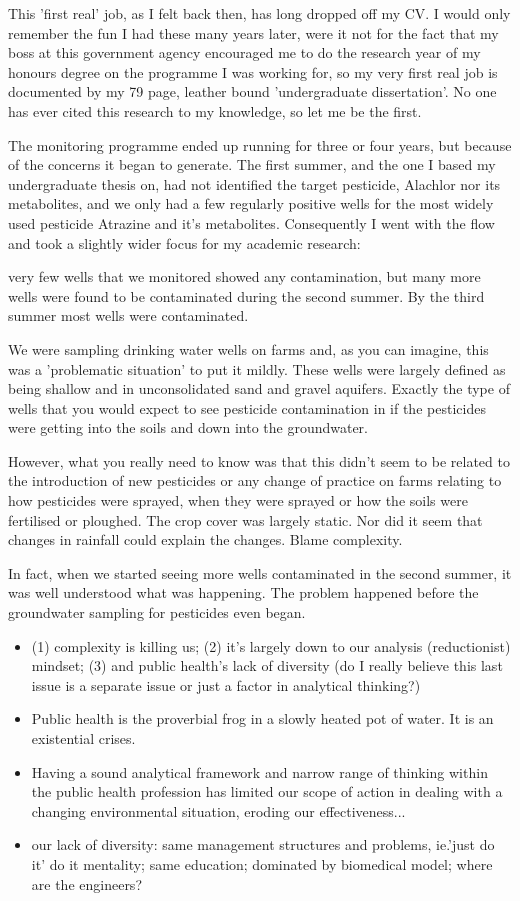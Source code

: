 This 'first real' job, as I felt back then, has long dropped off my CV. I would only remember the fun I had these many years later, were it not for the fact that my boss at this government agency encouraged me to do the research year of my honours degree on the programme I was working for, so my very first real job is documented by my 79 page, leather bound 'undergraduate dissertation'. No one has ever cited this research to my knowledge, so let me be the first\cite{Skelly1988}.

The monitoring programme ended up running for three or four years, but  because of the concerns it began to generate. The first summer, and the one I based my undergraduate thesis on, had not identified the target pesticide, Alachlor nor its metabolites, and we only had a few regularly positive wells for the most widely used pesticide Atrazine and it's metabolites. Consequently I went with the flow and took a slightly wider focus for my academic research: 

very few wells that we monitored showed any contamination, but many more wells were found to be contaminated during the second summer. By the third summer most wells were contaminated. 

We were sampling drinking water wells on farms and, as you can imagine, this was a 'problematic situation' to put it mildly. These wells were largely defined as being shallow and in unconsolidated sand and gravel aquifers. Exactly the type of wells that you would expect to see pesticide contamination in if the pesticides were getting into the soils and down into the groundwater. 

However, what you really need to know was that this didn't seem to be related to the introduction of new pesticides or any change of practice on farms relating to how pesticides were sprayed, when they were sprayed or how the soils were fertilised or ploughed. The crop cover was largely static. Nor did it seem that changes in rainfall could explain the changes. Blame complexity.

In fact, when we started seeing more wells contaminated in the second summer, it was well understood what was happening. The problem happened before the groundwater sampling for pesticides even began.


\begin{itemize}
	\item (1) complexity is killing us; (2) it's largely down to our analysis (reductionist) mindset; (3) and public health's lack of diversity (do I really believe this last issue is a separate issue or just a factor in analytical thinking?)
	\item Public health is the proverbial frog in a slowly heated pot of water. It is an existential crises.
	\item Having a sound analytical framework and narrow range of thinking within the public health profession has limited our scope of action in dealing with a changing environmental situation, eroding our effectiveness...
	\item our lack of diversity: same management structures and problems, ie.'just do it' do it mentality; same education; dominated by biomedical model; where are the engineers?
\end{itemize}

